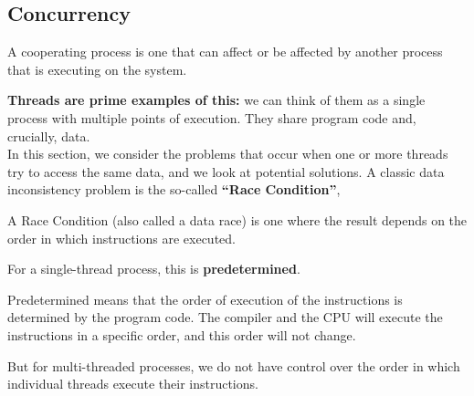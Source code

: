 \documentclass[a4paper, 10pt]{article}
\begin{document}
\subsection{Concurrency}
\begin{definitionbox}{}{}
    A cooperating process is one that can affect or be affected by another process that is executing on the system.
\end{definitionbox}
\noindent \textbf{Threads are prime examples of this:} we can think of them as a single process with multiple points of execution. They share program code and, crucially, data. \\[2ex]
In this section, we consider the problems that occur when one or more threads try to access the same data, and we look at potential solutions. A classic data inconsistency problem is the so-called \textbf{“Race Condition”},
\begin{definitionbox}{}{}
    A Race Condition (also called a data race) is one where the result depends on the order in which instructions are executed.
\end{definitionbox}
\noindent For a single-thread process, this is \textbf{predetermined}.
\begin{definitionbox}{}{}
    Predetermined means that the order of execution of the instructions is determined by the program code. The compiler and the CPU will execute the instructions in a specific order, and this order will not change.
\end{definitionbox}
\noindent But for multi-threaded processes, we do not have control over the order in which individual threads execute their instructions.
\end{document}
